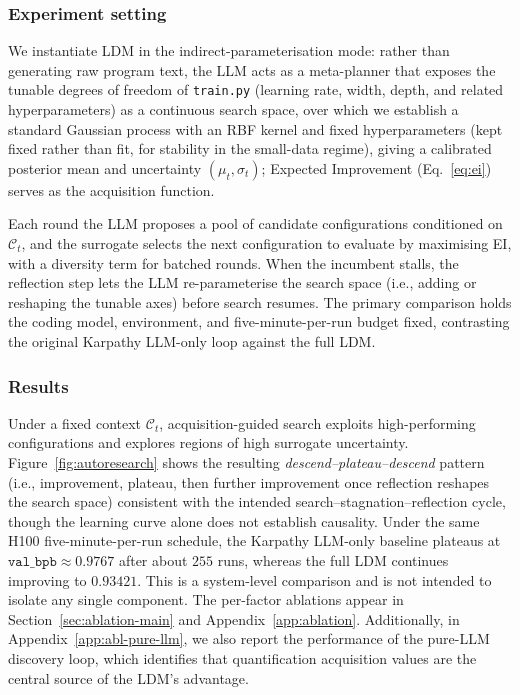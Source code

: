 \subsubsection{Experiment setting}

We instantiate LDM in the indirect-parameterisation mode: rather than generating raw program text, the LLM acts as a meta-planner that exposes the tunable degrees of freedom of \texttt{train.py} (learning rate, width, depth, and related hyperparameters) as a continuous search space, over which we establish a standard Gaussian process with an RBF kernel and fixed hyperparameters (kept fixed rather than fit, for stability in the small-data regime), giving a calibrated posterior mean and uncertainty $(\mu_t,\sigma_t)$; Expected Improvement (Eq.~\eqref{eq:ei}) serves as the acquisition function.

Each round the LLM proposes a pool of candidate configurations conditioned on $\mathcal C_t$, and the surrogate selects the next configuration to evaluate by maximising EI, with a diversity term for batched rounds. When the incumbent stalls, the reflection step lets the LLM re-parameterise the search space (i.e., adding or reshaping the tunable axes) before search resumes. The primary comparison holds the coding model, environment, and five-minute-per-run budget fixed, contrasting the original Karpathy LLM-only loop against the full LDM.

\subsubsection{Results}

Under a fixed context $\mathcal C_t$, acquisition-guided search exploits high-performing configurations and explores regions of high surrogate uncertainty. Figure~\ref{fig:autoresearch} shows the resulting \emph{descend--plateau--descend} pattern (i.e., improvement, plateau, then further improvement once reflection reshapes the search space) consistent with the intended search--stagnation--reflection cycle, though the learning curve alone does not establish causality. Under the same H100 five-minute-per-run schedule, the Karpathy LLM-only baseline plateaus at $\texttt{val\_bpb}\approx0.9767$ after about $255$ runs, whereas the full LDM continues improving to $0.93421$. This is a system-level comparison and is not intended to isolate any single component. The per-factor ablations appear in Section~\ref{sec:ablation-main} and Appendix~\ref{app:ablation}. Additionally, in Appendix~\ref{app:abl-pure-llm}, we also report the performance of the pure-LLM discovery loop, which identifies that quantification acquisition values are the central source of the LDM's advantage.

